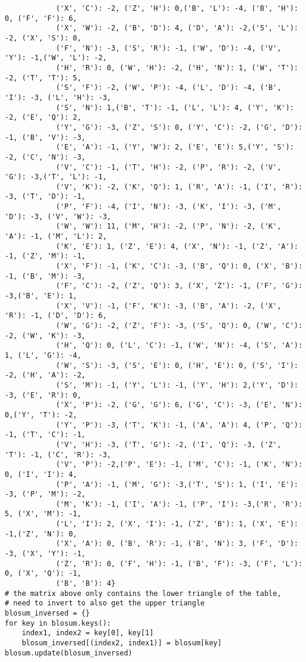 \begin{lstlisting}
            ('X', 'C'): -2, ('Z', 'H'): 0,('B', 'L'): -4, ('B', 'H'): 0, ('F', 'F'): 6, 
            ('X', 'W'): -2, ('B', 'D'): 4, ('D', 'A'): -2,('S', 'L'): -2, ('X', 'S'): 0, 
            ('F', 'N'): -3, ('S', 'R'): -1, ('W', 'D'): -4, ('V', 'Y'): -1,('W', 'L'): -2, 
            ('H', 'R'): 0, ('W', 'H'): -2, ('H', 'N'): 1, ('W', 'T'): -2, ('T', 'T'): 5,
            ('S', 'F'): -2, ('W', 'P'): -4, ('L', 'D'): -4, ('B', 'I'): -3, ('L', 'H'): -3, 
            ('S', 'N'): 1,('B', 'T'): -1, ('L', 'L'): 4, ('Y', 'K'): -2, ('E', 'Q'): 2,
            ('Y', 'G'): -3, ('Z', 'S'): 0, ('Y', 'C'): -2, ('G', 'D'): -1, ('B', 'V'): -3, 
            ('E', 'A'): -1, ('Y', 'W'): 2, ('E', 'E'): 5,('Y', 'S'): -2, ('C', 'N'): -3, 
            ('V', 'C'): -1, ('T', 'H'): -2, ('P', 'R'): -2, ('V', 'G'): -3,('T', 'L'): -1, 
            ('V', 'K'): -2, ('K', 'Q'): 1, ('R', 'A'): -1, ('I', 'R'): -3, ('T', 'D'): -1,
            ('P', 'F'): -4, ('I', 'N'): -3, ('K', 'I'): -3, ('M', 'D'): -3, ('V', 'W'): -3, 
            ('W', 'W'): 11, ('M', 'H'): -2, ('P', 'N'): -2, ('K', 'A'): -1, ('M', 'L'): 2, 
            ('K', 'E'): 1, ('Z', 'E'): 4, ('X', 'N'): -1, ('Z', 'A'): -1, ('Z', 'M'): -1,
            ('X', 'F'): -1, ('K', 'C'): -3, ('B', 'Q'): 0, ('X', 'B'): -1, ('B', 'M'): -3,
            ('F', 'C'): -2, ('Z', 'Q'): 3, ('X', 'Z'): -1, ('F', 'G'): -3,('B', 'E'): 1,
            ('X', 'V'): -1, ('F', 'K'): -3, ('B', 'A'): -2, ('X', 'R'): -1, ('D', 'D'): 6,
            ('W', 'G'): -2, ('Z', 'F'): -3, ('S', 'Q'): 0, ('W', 'C'): -2, ('W', 'K'): -3,
            ('H', 'Q'): 0, ('L', 'C'): -1, ('W', 'N'): -4, ('S', 'A'): 1, ('L', 'G'): -4,
            ('W', 'S'): -3, ('S', 'E'): 0, ('H', 'E'): 0, ('S', 'I'): -2, ('H', 'A'): -2,
            ('S', 'M'): -1, ('Y', 'L'): -1, ('Y', 'H'): 2,('Y', 'D'): -3, ('E', 'R'): 0,
            ('X', 'P'): -2, ('G', 'G'): 6, ('G', 'C'): -3, ('E', 'N'): 0,('Y', 'T'): -2,
            ('Y', 'P'): -3, ('T', 'K'): -1, ('A', 'A'): 4, ('P', 'Q'): -1, ('T', 'C'): -1,
            ('V', 'H'): -3, ('T', 'G'): -2, ('I', 'Q'): -3, ('Z', 'T'): -1, ('C', 'R'): -3, 
            ('V', 'P'): -2,('P', 'E'): -1, ('M', 'C'): -1, ('K', 'N'): 0, ('I', 'I'): 4, 
            ('P', 'A'): -1, ('M', 'G'): -3,('T', 'S'): 1, ('I', 'E'): -3, ('P', 'M'): -2, 
            ('M', 'K'): -1, ('I', 'A'): -1, ('P', 'I'): -3,('R', 'R'): 5, ('X', 'M'): -1,
            ('L', 'I'): 2, ('X', 'I'): -1, ('Z', 'B'): 1, ('X', 'E'): -1,('Z', 'N'): 0,
            ('X', 'A'): 0, ('B', 'R'): -1, ('B', 'N'): 3, ('F', 'D'): -3, ('X', 'Y'): -1,
            ('Z', 'R'): 0, ('F', 'H'): -1, ('B', 'F'): -3, ('F', 'L'): 0, ('X', 'Q'): -1,
            ('B', 'B'): 4}
# the matrix above only contains the lower triangle of the table,
# need to invert to also get the upper triangle
blosum_inversed = {}
for key in blosum.keys():
    index1, index2 = key[0], key[1]
    blosum_inversed[(index2, index1)] = blosum[key]
blosum.update(blosum_inversed)
\end{lstlisting}